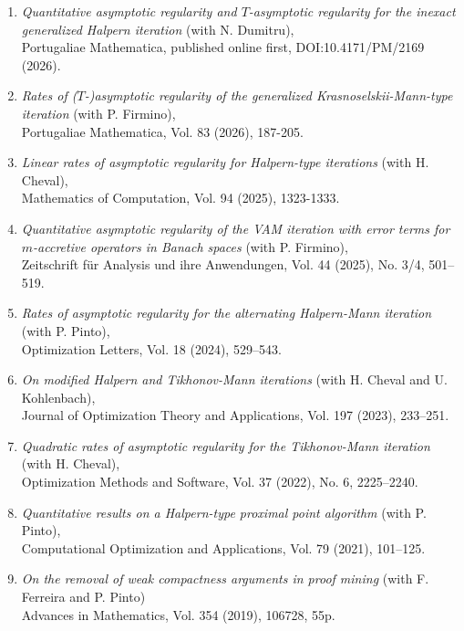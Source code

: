 \documentclass[12pt]{article}
\begin{document}
\begin{enumerate}

\item {\em Quantitative asymptotic regularity and $T$-asymptotic regularity for the inexact generalized Halpern iteration} (with N. Dumitru), \\
Portugaliae Mathematica, published online first, DOI:10.4171/PM/2169 (2026).

\item {\em Rates of ($T$-)asymptotic regularity of the generalized Krasnoselskii-Mann-type iteration} (with P. Firmino), \\
Portugaliae Mathematica, Vol. 83 (2026), 187-205.

\item {\em Linear rates of asymptotic regularity for Halpern-type iterations}
(with H. Cheval), \\
Mathematics of Computation, Vol.  94 (2025),  1323-1333.

\item {\em Quantitative asymptotic regularity of the VAM iteration with error terms for $m$-accretive operators in Banach spaces}
(with P. Firmino), \\
Zeitschrift für Analysis und ihre Anwendungen, Vol. 44 (2025), No. 3/4, 501–519.

\item {\em Rates of asymptotic regularity for the alternating Halpern-Mann iteration}
(with P. Pinto), \\
Optimization Letters, Vol. 18  (2024), 529–543.

\item {\em On modified Halpern and Tikhonov-Mann iterations}
(with H. Cheval and U. Kohlenbach), \\
Journal of Optimization Theory and Applications, Vol. 197 (2023), 233--251.

\item {\em Quadratic rates of asymptotic regularity for the Tikhonov-Mann iteration}
(with H. Cheval), \\
Optimization Methods and Software, Vol. 37 (2022), No. 6, 2225--2240.

\item {\em Quantitative results on a Halpern-type proximal point algorithm} (with P. Pinto), \\
Computational Optimization and Applications, Vol. 79 (2021), 101--125.

\item {\em On the removal of weak compactness arguments in proof mining} (with F. Ferreira and P. Pinto) \\
Advances in Mathematics, Vol. 354 (2019), 106728, 55p.


\end{enumerate}
\end{document}
